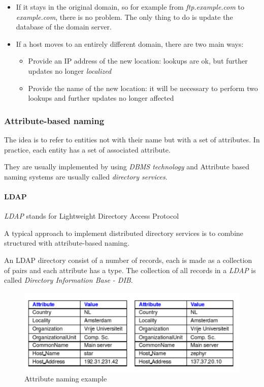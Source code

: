 \begin{itemize}
\item
  If it stays in the original domain, so for example from
  \emph{ftp.example.com} to \emph{example.com}, there is no problem. The
  only thing to do is update the database of the domain server.
\item
  If a host moves to an entirely different domain, there are two main
  ways:
  \begin{itemize}
    \item
      Provide an IP address of the new location: lookups are ok, but further
      updates no longer \textit{localized}
    \item
      Provide the name of the new location: it will be necessary to perform
      two lookups and further updates no longer affected
  \end{itemize}
\end{itemize}

\subsubsection{Attribute-based naming}

The idea is to refer to entities not with their name but with a set of
attributes. In practice, each entity has a set of associated attribute.

They are usually implemented by using \emph{DBMS technology} and
Attribute based naming systems are usually called \emph{directory
services}.

\paragraph{LDAP}
\textit{LDAP} stands for Lightweight Directory Access Protocol

A typical approach to implement distributed directory services is to
combine structured with attribute-based naming.

An LDAP directory consist of a number of records, each is made as a
collection of \emph{} pairs and each attribute has a type. The
collection of all records in a \emph{LDAP} is called \emph{Directory
Information Base - DIB}.

\begin{figure}[h]
    \caption{Attribute naming example}
    \includegraphics[width=\textwidth]{src/images/naming/attribute-naming.png}
    \centering
\end{figure}

